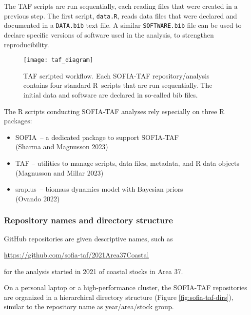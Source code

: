 \documentclass[12pt]{article}
\newcommand\blue[1]{\textcolor{darkblue}{#1}}
\newcommand\SOFIA{{\sf SOFIA}}
\newcommand\sraplus{{\sf sraplus}}
\begin{document}
The TAF scripts are run sequentially, each reading files that were created in a
previous step. The first script, \verb|data.R|, reads data files that were
declared and documented in a \verb|DATA.bib| text file. A similar
\verb|SOFTWARE.bib| file can be used to declare specific versions of software
used in the analysis, to strengthen reproducibility.

\begin{figure}[htb]
  \begin{center}
    \texttt{[image: taf\_diagram]}
    \vspace{2ex}
    \caption{TAF scripted workflow. Each SOFIA-TAF repository/analysis contains
      four standard R~scripts that are run sequentially. The initial data and
      software are declared in so-called bib files.}
    \label{fig:taf-diagram}
  \end{center}
\end{figure}

\newpage

The R scripts conducting SOFIA-TAF analyses rely especially on three R
packages:\\[-2ex]

\begin{itemize}
  \item \SOFIA\ -- a dedicated package to support SOFIA-TAF\\
  (Sharma and Magnusson 2023)
  \item {\sf TAF} -- utilities to manage scripts, data files, metadata, and R
  data objects\\
  (Magnusson and Millar 2023)
  \item \sraplus\ -- biomass dynamics model with Bayesian priors\\
  (Ovando 2022)
\end{itemize}

\subsubsection{Repository names and directory structure}

GitHub repositories are given descriptive names, such as

\qquad\blue{\url{https://github.com/sofia-taf/2021Area37Coastal}}

for the analysis started in 2021 of coastal stocks in Area 37.

On a personal laptop or a high-performance cluster, the SOFIA-TAF repositories
are organized in a hierarchical directory structure (Figure
\ref{fig:sofia-taf-dirs}), similar to the repository name as year/area/stock
group.\\
\end{document}
